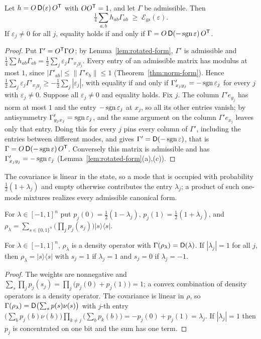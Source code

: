 \begin{theorem}\label{thm:variational}
Let $h=O\,\mathsf D(\varepsilon)\,O^{\mathsf T}$ with $OO^{\mathsf T}=1$, and let $\Gamma$ be admissible. Then
\[
 \tfrac14\sum_{a,b}h_{ab}\Gamma_{ab}\;\geq\;\mathcal E_{\mathrm{gs}}(\varepsilon).
\]
If $\varepsilon_j\neq0$ for all $j$, equality holds if and only if
$\Gamma=O\,\mathsf D(-\operatorname{sgn}\varepsilon)\,O^{\mathsf T}$.
\end{theorem}
\begin{proof}
Put $\Gamma'=O^{\mathsf T}\Gamma O$; by Lemma~\ref{lem:rotated-form}, $\Gamma'$ is admissible and
$\tfrac14\sum h_{ab}\Gamma_{ab}=\tfrac12\sum_j\varepsilon_j\Gamma'_{x_jy_j}$.
Every entry of an admissible matrix has modulus at most $1$, since
$|\Gamma'_{ab}|\leq\|\Gamma'e_b\|\leq1$ (Theorem~\ref{thm:norm-form}). Hence
$\tfrac12\sum_j\varepsilon_j\Gamma'_{x_jy_j}\geq-\tfrac12\sum_j|\varepsilon_j|$,
with equality if and only if $\Gamma'_{x_jy_j}=-\operatorname{sgn}\varepsilon_j$ for every $j$ with
$\varepsilon_j\neq0$. Suppose all $\varepsilon_j\neq0$ and equality holds. Fix $j$. The
column $\Gamma'e_{y_j}$ has norm at most $1$ and the entry $-\operatorname{sgn}\varepsilon_j$ at $x_j$, so
all its other entries vanish; by antisymmetry $\Gamma'_{y_jx_j}=\operatorname{sgn}\varepsilon_j$, and the
same argument on the column $\Gamma'e_{x_j}$ leaves only that entry. Doing this for every
$j$ pins every column of $\Gamma'$, including the entries between different modes, and
gives $\Gamma'=\mathsf D(-\operatorname{sgn}\varepsilon)$, that is $\Gamma=O\,\mathsf D(-\operatorname{sgn}\varepsilon)\,O^{\mathsf T}$.
Conversely this matrix is admissible and has $\Gamma'_{x_jy_j}=-\operatorname{sgn}\varepsilon_j$
(Lemma~\ref{lem:rotated-form}(a),(c)).
\end{proof}

The covariance is linear in the state, so a mode that is occupied with probability
$\tfrac12(1+\lambda_j)$ and empty otherwise contributes the entry $\lambda_j$; a product of
such one-mode mixtures realizes every admissible canonical form.
\begin{definition}\label{def:mixture}
For $\lambda\in[-1,1]^n$ put $p_j(0)=\tfrac12(1-\lambda_j)$, $p_j(1)=\tfrac12(1+\lambda_j)$,
and $\rho_\lambda=\sum_{s\in\{0,1\}^n}\bigl(\prod_jp_j(s_j)\bigr)|s\rangle\langle s|$.
\end{definition}

\begin{theorem}\label{thm:mixture}
For $\lambda\in[-1,1]^n$, $\rho_\lambda$ is a density operator with
$\Gamma(\rho_\lambda)=\mathsf D(\lambda)$. If $|\lambda_j|=1$ for all $j$, then
$\rho_\lambda=|s\rangle\langle s|$ with $s_j=1$ if $\lambda_j=1$ and $s_j=0$ if $\lambda_j=-1$.
\end{theorem}
\begin{proof}
The weights are nonnegative and $\sum_s\prod_jp_j(s_j)=\prod_j\bigl(p_j(0)+p_j(1)\bigr)=1$;
a convex combination of density operators is a density operator. The covariance is linear
in $\rho$, so $\Gamma(\rho_\lambda)=\mathsf D\bigl(\sum_sp(s)\nu(s)\bigr)$ with $j$-th entry
$\bigl(\sum_bp_j(b)\nu(b)\bigr)\prod_{k\neq j}\bigl(\sum_bp_k(b)\bigr)=-p_j(0)+p_j(1)=\lambda_j$.
If $|\lambda_j|=1$ then $p_j$ is concentrated on one bit and the sum has one term.
\end{proof}


